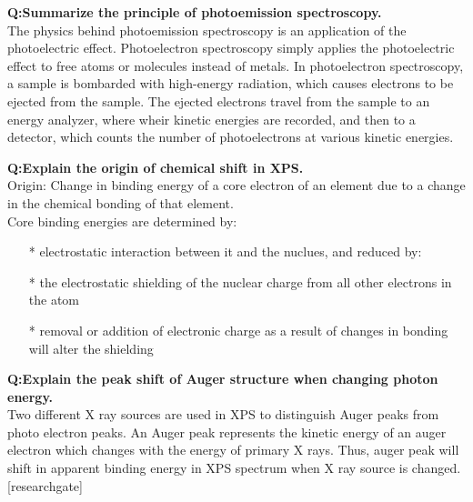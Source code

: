 \documentclass{article}
\begin{document}
\newpage
\noindent \textbf{Q:Summarize the principle of photoemission spectroscopy.}\\
\noindent The physics behind photoemission spectroscopy is an application of the photoelectric effect. Photoelectron spectroscopy simply applies the photoelectric effect to free atoms or molecules instead of metals. In photoelectron spectroscopy, a sample is bombarded with high-energy radiation, which causes electrons to be ejected from the sample. The ejected electrons travel from the sample to an energy analyzer, where wheir kinetic energies are recorded, and then to a detector, which counts the number of photoelectrons at various kinetic energies.


\newpage
\noindent \textbf{Q:Explain the origin of chemical shift in XPS.}\\
\noindent Origin: Change in binding energy of a core electron of an element due to a change in the chemical bonding of that element.\\
\noindent Core binding energies are determined by:\\
\begin{itemize}
\item[*] electrostatic interaction between it and the nuclues, and reduced by:
\item[*] the electrostatic shielding of the nuclear charge from all other electrons in the atom 
\item[*] removal or addition of electronic charge as a result of changes in bonding will alter the shielding
\end{itemize}


\newpage
\noindent \textbf{Q:Explain the peak shift of Auger structure when changing photon energy.}\\
\noindent Two different X ray sources are used in XPS to distinguish Auger peaks from photo electron peaks. An Auger peak represents the kinetic energy of an auger electron which changes with the energy of primary X rays. Thus, auger peak will shift in apparent binding energy in XPS spectrum when X ray source is changed. [researchgate]\\
\end{document}

